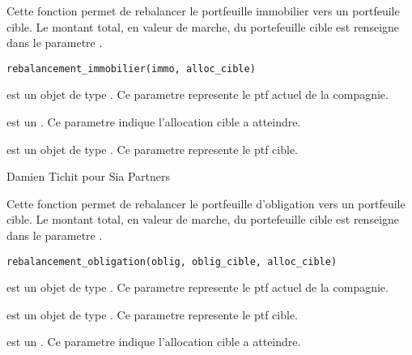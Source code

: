 \documentclass[a4paper]{book}
\begin{document}
%
\begin{Description}\relax
Cette fonction permet de rebalancer le portfeuille immobilier vers un portfeuile cible.
Le montant total, en valeur de marche, du portefeuille cible est renseigne dans le parametre .
\end{Description}
%
\begin{Usage}
\begin{verbatim}
rebalancement_immobilier(immo, alloc_cible)
\end{verbatim}
\end{Usage}
%
\begin{Arguments}
\begin{ldescription}
\item[\code{immo}] est un objet de type . Ce parametre represente le ptf actuel de la compagnie.

\item[\code{alloc\_cible}] est un . Ce parametre indique l'allocation cible a atteindre.

\item[\code{immo\_cible}] est un objet de type . Ce parametre represente le ptf cible.
\end{ldescription}
\end{Arguments}
%
\begin{Author}\relax
Damien Tichit pour Sia Partners
\end{Author}
%
\begin{Description}\relax
Cette fonction permet de rebalancer le portfeuille d'obligation vers un portfeuile cible.
Le montant total, en valeur de marche, du portefeuille cible est renseigne dans le parametre .
\end{Description}
%
\begin{Usage}
\begin{verbatim}
rebalancement_obligation(oblig, oblig_cible, alloc_cible)
\end{verbatim}
\end{Usage}
%
\begin{Arguments}
\begin{ldescription}
\item[\code{oblig}] est un objet de type . Ce parametre represente le ptf actuel de la compagnie.

\item[\code{oblig\_cible}] est un objet de type . Ce parametre represente le ptf cible.

\item[\code{alloc\_cible}] est un . Ce parametre indique l'allocation cible a atteindre.
\end{ldescription}
\end{Arguments}
\end{document}
